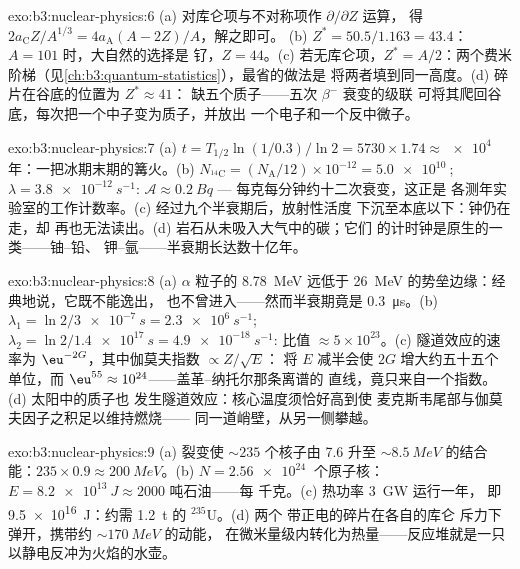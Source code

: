 \begin{solution}{exo:b3:nuclear-physics:6}
(a) 对库仑项与不对称项作 $\partial/\partial Z$ 运算，
得 $2a_{\text{C}}Z/A^{1/3} = 4a_{\text{A}}(A - 2Z)/A$，解之即可。
(b) $Z^* = 50.5/1.163 = 43.4$：$A = 101$ 时，大自然的选择是
钌，$Z = 44$。(c) 若无库仑项，$Z^* = A/2$：两个费米
阶梯（见\cref{ch:b3:quantum-statistics}），最省的做法是
将两者填到同一高度。(d) 碎片在谷底的位置为 $Z^* \approx 41$：
缺五个质子——五次 $\beta^-$ 衰变的级联
可将其爬回谷底，每次把一个中子变为质子，并放出
一个电子和一个反中微子。
\end{solution}

\begin{solution}{exo:b3:nuclear-physics:7}
(a) $t = T_{1/2}\ln(1/0.3)/\ln2 = 5730\times1.74 \approx
\qty{e4}{}$ 年：一把冰期末期的篝火。(b) $N_{^{14}\text{C}}
= (N_{\text{A}}/12)\times10^{-12} = \qty{5.0e10}{}$; $\lambda =
\qty{3.8e-12}{s^{-1}}$: $\mathcal A \approx \qty{0.2}{Bq}$ ---
每克每分钟约十二次衰变，这正是
各测年实验室的工作计数率。(c) 经过九个半衰期后，放射性活度
下沉至本底以下：钟仍在走，却
再也无法读出。(d) 岩石从未吸入大气中的碳；它们
的计时钟是原生的一类——铀–铅、
钾–氩——半衰期长达数十亿年。
\end{solution}

\begin{solution}{exo:b3:nuclear-physics:8}
(a) $\alpha$ 粒子的 \qty{8.78}{MeV} 远低于
\qty{26}{MeV} 的势垒边缘：经典地说，它既不能逸出，
也不曾进入——然而半衰期竟是 \qty{0.3}{\micro s}。(b)
$\lambda_1 = \ln2/\qty{3e-7}{s} = \qty{2.3e6}{s^{-1}}$;
$\lambda_2 = \ln2/\qty{1.4e17}{s} = \qty{4.9e-18}{s^{-1}}$:
比值 $\approx 5\times10^{23}$。(c) 隧道效应的速率为
$\eu^{-2G}$，其中伽莫夫指数 $\propto Z/\sqrt E$：
将 $E$ 减半会使 $2G$ 增大约五十五个单位，而
$\eu^{55} \approx 10^{24}$——盖革–纳托尔那条离谱的
直线，竟只来自一个指数。(d) 太阳中的质子也
发生隧道效应：核心温度须恰好高到使
麦克斯韦尾部与伽莫夫因子之积足以维持燃烧——
同一道峭壁，从另一侧攀越。
\end{solution}

\begin{solution}{exo:b3:nuclear-physics:9}
(a) 裂变使 ${\sim}235$ 个核子由 \qty{7.6}{} 升至
${\sim}\qty{8.5}{MeV}$ 的结合能：$235\times0.9 \approx
\qty{200}{MeV}$。(b) $N = \qty{2.56e24}{}$ 个原子核：
$E = \qty{8.2e13}{J} \approx 2000$ 吨石油——每
千克。(c) 热功率 \qty{3}{GW} 运行一年，
即 \qty{9.5e16}{J}：约需 \qty{1.2}{t} 的 $^{235}$U。(d) 两个
带正电的碎片在各自的库仑
斥力下弹开，携带约 ${\sim}\qty{170}{MeV}$ 的动能，
在微米量级内转化为热量——反应堆就是一只
以静电反冲为火焰的水壶。
\end{solution}

